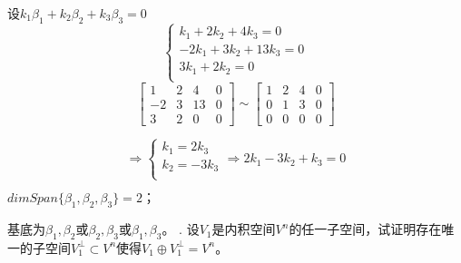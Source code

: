 \documentclass[a4paper, 12pt]{article}
\begin{document}
设\begin{math}k_{1}\beta_{1} + k_{2}\beta_{2} + k_{3}\beta_{3} = 0\end{math}
\[
\left\{                  %
\begin{array}{lll}     %
k_{1} + 2k_{2} + 4k_{3} = 0\\
-2k_{1} + 3k_{2} + 13k_{3} = 0\\
3k_{1} + 2k_{2} = 0\\
\end{array}           %
\right.              %
\]
$$\begin{bmatrix}
1& 2& 4& 0\\
-2& 3& 13& 0\\
3& 2& 0& 0
\end{bmatrix}
\sim
\begin{bmatrix}
1& 2& 4& 0\\
0& 1& 3& 0\\
0& 0& 0& 0
\end{bmatrix}
$$

\[
\Rightarrow
\left\{                  %
\begin{array}{lll}     %
k_{1} = 2k_{3}\\
k_{2} = -3k{_3}\\
\end{array}           %
\right.              %
\Rightarrow
2k_{1} - 3k_{2} + k_{3} = 0
\]

\begin{math}
dimSpan\{\beta_{1}, \beta_{2}, \beta_{3}\} = 2；
\end{math}

基底为\begin{math}\beta_{1}, \beta_{2}或\beta_{2}, \beta_{3}或\beta_{1}, \beta_{3}\end{math}。
. 设\begin{math}V_{1}\end{math}是内积空间\begin{math}V^{n}\end{math}的任一子空间，试证明存在唯一的子空间\begin{math}V_{1}^{\bot}\subset V^{n}\end{math}使得\begin{math}V_{1}\oplus V_{1}^{\bot} = V^{n}\end{math}。
\end{document}
